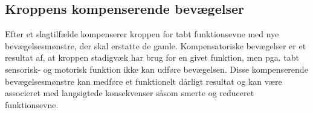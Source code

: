 \subsection{Kroppens kompenserende bevægelser}
Efter et slagtilfælde kompenserer kroppen for tabt funktionsevne med nye bevægelsesmønstre, der skal erstatte de gamle. Kompensatoriske bevægelser er et resultat af, at kroppen stadigvæk har brug for en givet funktion, men pga. tabt sensorisk- og motorisk funktion ikke kan udføre bevægelsen. Disse kompenserende bevægelsesmønstre kan medføre et funktionelt dårligt resultat og kan være associeret med langsigtede konsekvenser såsom smerte og reduceret funktionsevne. \cite{Takeuchi2012,Leea2009} %
